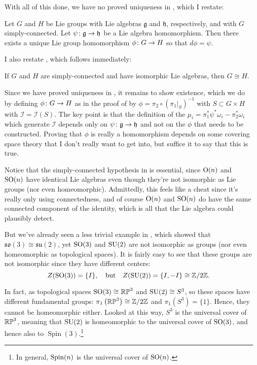 With all of this done, we have no proved uniqueness in , which I restate:

\begin{theorem*}
	Let $G$ and $H$ be Lie groups with Lie algebras $\mathfrak{g}$ and $\mathfrak{h}$, respectively, and with $G$ simply-connected. Let $\psi \colon\thinspace\! \mathfrak{g} \to \mathfrak{h}$ be a Lie algebra homomorphism. Then there exists a unique Lie group homomorphism $\phi \colon\thinspace\! G \to H$ so that $d\phi = \psi$.
\end{theorem*}

I also restate , which follows immediately:
\begin{corollary*}
	If $G$ and $H$ are simply-connected and have isomorphic Lie algebras, then $G \cong H$.
\end{corollary*}

Since we have proved uniqueness in , it remains to show existence, which we do by defining $\phi \colon\thinspace\! G \to H$ as in the proof of  by $\phi = \pi_2 \circ \left(\left. \pi_1\right|_S\right)^{-1}$ with $S \subset G \times H$ with $\mathcal{I} = \mathcal{I}(S)$. The key point is that the definition of the $\mu_i = \pi_1^\ast \psi^\ast \omega_i - \pi_2^\ast \omega_i$ which generate $\mathcal{I}$ depends only on $\psi \colon\thinspace\! \mathfrak{g} \to \mathfrak{h}$ and not on the $\phi$ that needs to be constructed. Proving that $\phi$ is really a homomorphism depends on some covering space theory that I don't really want to get into, but suffice it to say that this is true.

Notice that the simply-connected hypothesis in  is essential, since $\operatorname{O}(n)$ and $\operatorname{SO}(n)$ have identical Lie algebras even though they're not isomorphic as Lie groups (nor even homeomorphic). Admittedly, this feels like a cheat since it's really only using connectedness, and of course $\operatorname{O}(n)$ and $\operatorname{SO}(n)$ do have the same connected component of the identity, which is all that the Lie algebra could plausibly detect.

But we've already seen a less trivial example in , which showed that $\mathfrak{so}(3) \cong \mathfrak{su}(2)$, yet $\operatorname{SO}(3)$ and $\operatorname{SU}(2)$ are not isomorphic as groups (nor even homeomorphic as topological spaces). It is fairly easy to see that these groups are not isomorphic since they have different centers:
\[
	Z(\operatorname{SO}(3)) = \{I\}, \quad \text{but} \quad Z(\operatorname{SU}(2)) = \{I, -I\} \cong \mathbb{Z}/2\mathbb{Z}.
\]

In fact, as topological spaces $\operatorname{SO}(3) \cong \mathbb{RP}^3$ and $\operatorname{SU}(2) \cong S^3$, so these spaces have different fundamental groups: $\pi_1\left(\mathbb{RP}^3\right) \cong \mathbb{Z}/2\mathbb{Z}$ and $\pi_1\left(S^3\right) = \{1\}$. Hence, they cannot be homeomorphic either. Looked at this way, $S^3$ is the universal cover of $\mathbb{RP}^3$, meaning that $\operatorname{SU}(2)$ is homeomorphic to the universal cover of $\operatorname{SO}(3)$, and hence also to $\operatorname{Spin}(3)$.\footnote{In general, $\operatorname{Spin}(n)$ is the universal cover of $\operatorname{SO}(n)$.}